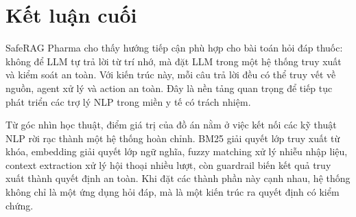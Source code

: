 \section{Kết luận cuối}

SafeRAG Pharma cho thấy hướng tiếp cận phù hợp cho bài toán hỏi đáp thuốc: không để LLM tự trả lời từ trí nhớ, mà đặt LLM trong một hệ thống truy xuất và kiểm soát an toàn. Với kiến trúc này, mỗi câu trả lời đều có thể truy vết về nguồn, agent xử lý và action an toàn. Đây là nền tảng quan trọng để tiếp tục phát triển các trợ lý NLP trong miền y tế có trách nhiệm.

Từ góc nhìn học thuật, điểm giá trị của đồ án nằm ở việc kết nối các kỹ thuật NLP rời rạc thành một hệ thống hoàn chỉnh. BM25 giải quyết lớp truy xuất từ khóa, embedding giải quyết lớp ngữ nghĩa, fuzzy matching xử lý nhiễu nhập liệu, context extraction xử lý hội thoại nhiều lượt, còn guardrail biến kết quả truy xuất thành quyết định an toàn. Khi đặt các thành phần này cạnh nhau, hệ thống không chỉ là một ứng dụng hỏi đáp, mà là một kiến trúc ra quyết định có kiểm chứng.
